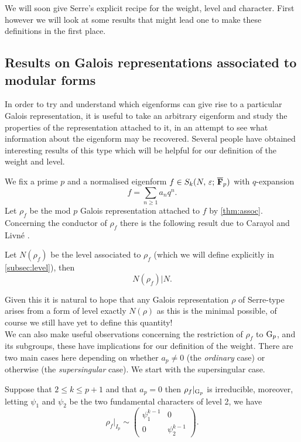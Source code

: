 \documentclass[a4paper,12pt]{article}
\begin{document}
We will soon give Serre's explicit recipe for the weight, level and character.
First however we will look at some results that might lead one to make these definitions in the first place.

\subsection{Results on Galois representations associated to modular forms}\label{sec:galassoc}
In order to try and understand which eigenforms can give rise to a particular Galois representation, it is useful to take an arbitrary eigenform and study the properties of the representation attached to it, in an attempt to see what information about the eigenform may be recovered.
Several people have obtained interesting results of this type which will be helpful for our definition of the weight and level.

We fix a prime $p$ and a normalised eigenform $f \in S_k(N,\,\varepsilon;\,\overline{\mathbf{F}}_p)$ with $q$-expansion
\[
f = \sum_{n\ge 1} a_nq^n.
\]
Let $\rho_f$ be the mod $p$ Galois representation attached to $f$ by \cref{thm:assoc}.
Concerning the conductor of $\rho_f$ there is the following result due to Carayol and Livn\'e \cite{Carayol, Livne}.

\begin{thm}\label{thm:level}
Let $N(\rho_f)$ be the level associated to $\rho_f$ (which we will define explicitly in \cref{subsec:level}), then
\[
N(\rho_f)|N.
\]
\end{thm}

Given this it is natural to hope that any Galois representation $\rho$ of Serre-type arises from a form of level exactly $N(\rho)$ as this is the minimal possible, of course we still have yet to define this quantity!
\\[12pt] \noindent
We can also make useful observations concerning the restriction of $\rho_f$ to $\mathrm{G}_p$, and its subgroups, these have implications for our definition of the weight.
There are two main cases here depending on whether $a_p \ne 0$ (the \emph{ordinary} case) or otherwise (the \emph{supersingular} case).
We start with the supersingular case.

\begin{thm}[Fontaine]\label{thm:super}
Suppose that $2\le k \le p +1$ and that $a_p = 0$ then $\rho_{f}|_{\mathrm{G}_p}$ is irreducible, moreover, letting $\psi_1$ and $\psi_2$ be the two fundamental characters of level 2, we have
\[
\rho_{f}|_{I_p} \sim \begin{pmatrix} \psi_1^{k-1} & 0 \\ 0 & \psi_2^{k-1}\end{pmatrix}.
\]
\end{thm}
\end{document}
